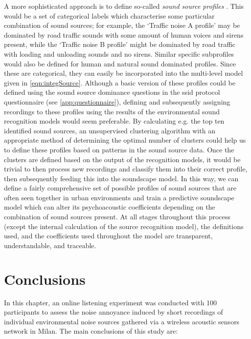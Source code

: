 A more sophisticated approach is to define so-called \emph{sound source profiles} \citep{Kang2018model,Berglund2006Tool}. This would be a set of categorical labels which characterise some particular combination of sound sources; for example, the `Traffic noise A profile' may be dominated by road traffic sounds with some amount of human voices and sirens present, while the `Traffic noise B profile' might be dominated by road traffic with loading and unloading sounds and no sirens. Similar specific subprofiles would also be defined for human and natural sound dominated profiles. Since these are categorical, they can easily be incorporated into the multi-level model given in \cref{eqn:integSource}. Although a basic version of these profiles could be defined using the sound source dominance questions in the \gls{ssid} protocol questionnaire (see \cref{app:questionnaire}), defining and subsequently assigning recordings to these profiles using the results of the environmental sound recognition models would seem preferable. By calculating e.g. the top ten identified sound sources, an unsupervised clustering algorithm with an appropriate method of determining the optimal number of clusters could help us to define these profiles based on patterns in the sound source data. Once the clusters are defined based on the output of the recognition models, it would be trivial to then process new recordings and classify them into their correct profile, then subsequently feeding this into the soundscape model. In this way, we can define a fairly comprehensive set of possible profiles of sound sources that are often seen together in urban environments and train a predictive soundscape model which can alter its psychoacoustic coefficients depending on the combination of sound sources present. At all stages throughout this process (except the internal calculation of the source recognition model), the definitions used, and the coefficients used throughout the model are transparent, understandable, and traceable. 


\section{Conclusions}

In this chapter, an online listening experiment was conducted with 100 participants to assess the noise annoyance induced by short recordings of individual environmental noise sources gathered via a wireless acoustic sensors network in Milan. The main conclusions of this study are:

